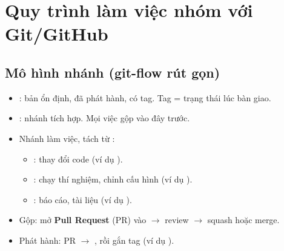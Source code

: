 \section{Quy trình làm việc nhóm với Git/GitHub}
\label{sec:git}

\subsection{Mô hình nhánh (git-flow rút gọn)}

\begin{itemize}
\item {}: bản ổn định, đã phát hành, có tag. Tag  = trạng thái lúc bàn giao.
\item {}: nhánh tích hợp. Mọi việc gộp vào đây trước.
\item Nhánh làm việc, tách từ :
  \begin{itemize}
  \item {}: thay đổi code (ví dụ ).
  \item {}: chạy thí nghiệm, chỉnh cấu hình (ví dụ ).
  \item {}: báo cáo, tài liệu (ví dụ ).
  \end{itemize}
\item Gộp: mở \textbf{Pull Request} (PR) vào  $\rightarrow$ review $\rightarrow$ squash hoặc merge.
\item Phát hành: PR  $\rightarrow$ , rồi gắn tag (ví dụ ).
\end{itemize}

